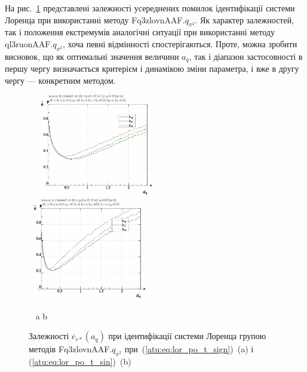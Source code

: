 На рис.~\ref{atu:f:lor_a_q_Fq3zlovnAAF.q_x2} представлені залежності усереднених
помилок ідентифікації системи Лоренца при використанні методу
Fq3zlovnAAF.$q_{x^2}$.
Як характер залежностей, так і положення екстремумів аналогічні
ситуації при використанні методу
ql3ruonAAF.$q_{x^2}$,
хоча певні відмінності спостерігаються. Проте, можна зробити
висновок, що як оптимальні значення величини
$a_q$, так і діапазон застосовності в першу чергу визначається
критерієм і динамікою зміни параметра, і вже в другу чергу ---
конкретним методом.


\begin{figure}[ht!]
  \begin{center}
    ~ \hfill
    \includegraphics[width=0.49\textwidth]{p/cha/lor/Fq3zlovnAAF/lor_Fq3zlovnAAF_qx2-p_a_q_e_sign.png}
    \hfill
    \includegraphics[width=0.49\textwidth]{p/cha/lor/Fq3zlovnAAF/lor_Fq3zlovnAAF_qx2-p_a_q_e_sin.png}
    \hfill ~
  \end{center}
  \vspace{-1.0ex}
  \begin{center}
    ~ \hfill a \hfill\hfill b \hfill ~
  \end{center}
  \vspace{-1.5ex}
  \caption{Залежності $ \overline{e}_{r *} (a_q) $ при ідентифікації системи Лоренца групою методів Fq3zlovnAAF.$q_{x^2} $ при~(\ref{atu:eq:lor_po_t_sign})~(a) і (\ref{atu:eq:lor_po_t_sin})~(b)}
\label{atu:f:lor_a_q_Fq3zlovnAAF.q_x2}
\end{figure}


